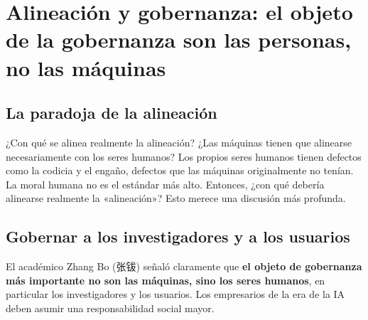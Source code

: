 \section{Alineación y gobernanza: el objeto de la gobernanza son las personas, no las máquinas}

\subsection{La paradoja de la alineación}

\begin{warningbox}{¿Con qué se alinea realmente la alineación?}
¿Las máquinas tienen que alinearse necesariamente con los seres humanos? Los propios seres humanos tienen defectos como la codicia y el engaño, defectos que las máquinas originalmente no tenían. La moral humana no es el estándar más alto. Entonces, ¿con qué debería alinearse realmente la «alineación»? Esto merece una discusión más profunda.
\end{warningbox}

\subsection{Gobernar a los investigadores y a los usuarios}

El académico Zhang Bo (张钹) señaló claramente que \textbf{el objeto de gobernanza más importante no son las máquinas, sino los seres humanos}, en particular los investigadores y los usuarios. Los empresarios de la era de la IA deben asumir una responsabilidad social mayor.

